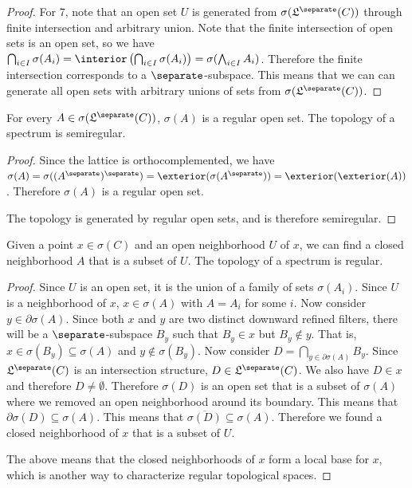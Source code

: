 \begin{proof}
		For 7, note that an open set $U$ is generated from $\sigma(\mathfrak{L}^\separate(C))$ through finite intersection and arbitrary union. Note that the finite intersection of open sets is an open set, so we have $\bigcap_{i \in I} \sigma(A_i) = \interior\left(\bigcap_{i \in I} \sigma(A_i)\right) = \sigma(\bigwedge_{i \in I} A_i)$. Therefore the finite intersection corresponds to a $\separate$-subspace. This means that we can can generate all open sets with arbitrary unions of sets from $\sigma(\mathfrak{L}^\separate(C))$.
	\end{proof}

\begin{coro}
	For every $A \in\sigma(\mathfrak{L}^\separate(C))$, $\sigma(A)$ is a regular open set. The topology of a spectrum is semiregular.
\end{coro}

\begin{proof}
	Since the lattice is orthocomplemented, we have $\sigma(A) = \sigma((A^{\separate})^{\separate}) = \exterior(\sigma(A^{\separate})) = \exterior(\exterior(A))$. Therefore $\sigma(A)$ is a regular open set.
	
	The topology is generated by regular open sets, and is therefore semiregular.
\end{proof}

\begin{conj}
	Given a point $x \in \sigma(C)$ and an open neighborhood $U$ of $x$, we can find a closed neighborhood $A$ that is a subset of $U$. The topology of a spectrum is regular.
\end{conj}

\begin{proof}
	Since $U$ is an open set, it is the union of a family of sets $\sigma(A_i)$. Since $U$ is a neighborhood of $x$, $x \in \sigma(A)$ with $A = A_i$ for some $i$. Now consider $y \in \partial \sigma(A)$. Since both $x$ and $y$ are two distinct downward refined filters, there will be a $\separate$-subspace $B_y$ such that $B_y \in x$ but $B_y \notin y$. That is, $x \in \sigma(B_y) \subseteq \sigma(A)$ and $y \notin \sigma(B_y)$. Now consider $D = \bigcap_{y \in \partial \sigma(A)} B_y$. Since $\mathfrak{L}^\separate(C)$ is an intersection structure, $D \in \mathfrak{L}^\separate(C)$. We also have $D \in x$ and therefore $D \neq \emptyset$. Therefore $\sigma(D)$ is an open set that is a subset of $\sigma(A)$ where we removed an open neighborhood around its boundary. This means that $\partial \sigma(D) \subseteq \sigma(A)$. This means that $\overline{\sigma(D)} \subseteq \sigma(A)$. Therefore we found a closed neighborhood of $x$ that is a subset of $U$.
	
	The above means that the closed neighborhoods of $x$ form a local base for $x$, which is another way to characterize regular topological spaces.
\end{proof}

